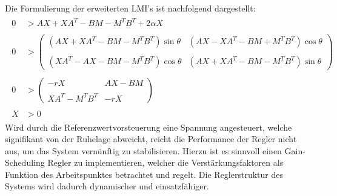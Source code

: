 Die Formulierung der erweiterten LMI's ist nachfolgend dargestellt:\\
\begin{align*}
    \begin{split}
        0 &> AX + XA^T - BM -M^TB^T + 2\alpha X\\\\
        0 &>
        \begin{pmatrix}
            (AX + XA^T - BM - M^TB^T)\sin\theta & (AX - XA^T - BM + M^TB^T)\cos\theta \\\\
            (XA^T - AX - BM - M^TB^T)\cos\theta & (AX + XA^T - BM - M^TB^T)\sin\theta
        \end{pmatrix}\\\\
        0 &> 
        \begin{pmatrix}
            -rX & AX - B M \\\\
            XA^T - M^TB^T & -rX
        \end{pmatrix} \\\\
        X &> 0
    \end{split}
\end{align*}
\newline
Wird durch die Referenzwertvorsteuerung eine Spannung angesteuert, welche signifikant von der Ruhelage abweicht, reicht die Performance der Regler nicht aus, um das System vernünftig zu stabilisieren. Hierzu ist es sinnvoll einen Gain-Scheduling Regler zu implementieren, welcher die Verstärkungsfaktoren als Funktion des Arbeitspunktes betrachtet und regelt. Die Reglerstruktur des Systems wird dadurch dynamischer und einsatzfähiger.
